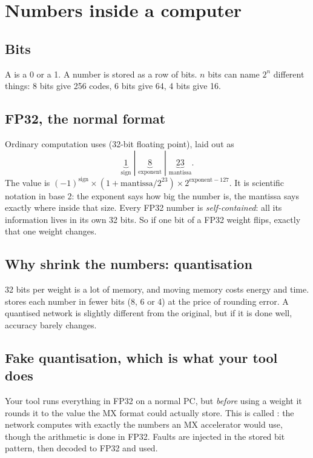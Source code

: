 \section{Numbers inside a computer}

\subsection{Bits}
A  is a 0 or a 1. A number is stored as a row of bits. $n$ bits can name $2^n$ different things:
8 bits give 256 codes, 6 bits give 64, 4 bits give 16.

\subsection{FP32, the normal format}
Ordinary computation uses  (32-bit floating point), laid out as
\[
\underbrace{1}_{\text{sign}}\;|\;\underbrace{8}_{\text{exponent}}\;|\;\underbrace{23}_{\text{mantissa}}.
\]
The value is $(-1)^{\text{sign}}\times(1+\text{mantissa}/2^{23})\times2^{\text{exponent}-127}$. It is scientific
notation in base 2: the exponent says how big the number is, the mantissa says exactly where inside that size.
Every FP32 number is \emph{self-contained}: all its information lives in its own 32 bits. So if one bit of a
FP32 weight flips, exactly that one weight changes.

\subsection{Why shrink the numbers: quantisation}
32 bits per weight is a lot of memory, and moving memory costs energy and time.  stores
each number in fewer bits (8, 6 or 4) at the price of rounding error. A quantised network is slightly
different from the original, but if it is done well, accuracy barely changes.

\subsection{Fake quantisation, which is what your tool does}
Your tool runs everything in FP32 on a normal PC, but \emph{before} using a weight it rounds it to the value
the MX format could actually store. This is called : the network computes with exactly
the numbers an MX accelerator would use, though the arithmetic is done in FP32. Faults are injected in the
stored bit pattern, then decoded to FP32 and used.

